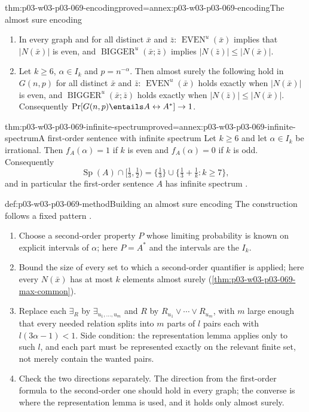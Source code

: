 \begin{hbtheorem}{thm:p03-w03-p03-069-encoding}{proved=annex:p03-w03-p03-069-encoding}{The almost sure encoding}
\begin{enumerate}
\item In every graph and for all distinct \(\bar x\) and \(\bar z\):
\(\operatorname{EVEN}^u(\bar x)\) implies that \(|N(\bar x)|\) is even, and
\(\operatorname{BIGGER}^u(\bar x;\bar z)\) implies
\(|N(\bar z)|\leq|N(\bar x)|\).
\item Let \(k\geq6\), \(\alpha\in I_k\) and \(p=n^{-\alpha}\).  Then almost
surely the following hold in \(G(n,p)\) for all distinct \(\bar x\) and
\(\bar z\): \(\operatorname{EVEN}^u(\bar x)\) holds exactly when
\(|N(\bar x)|\) is even, and \(\operatorname{BIGGER}^u(\bar x;\bar z)\) holds
exactly when \(|N(\bar z)|\leq|N(\bar x)|\).  Consequently
\(\Pr[G(n,p)\entails A\leftrightarrow A^*]\to1\).
\end{enumerate}
\end{hbtheorem}

\begin{hbtheorem}{thm:p03-w03-p03-069-infinite-spectrum}{proved=annex:p03-w03-p03-069-infinite-spectrum}{A first-order sentence with infinite spectrum}
Let \(k\geq6\) and let \(\alpha\in I_k\) be irrational.  Then
\(f_A(\alpha)=1\) if \(k\) is even and \(f_A(\alpha)=0\) if \(k\) is odd.
Consequently
\[
  \operatorname{Sp}(A)\cap\bigl[\tfrac13,\tfrac12\bigr)
  =\{\tfrac13\}\cup\bigl\{\tfrac13+\tfrac1k : k\geq7\bigr\},
\]
and in particular the first-order sentence \(A\) has infinite spectrum
\cite[pp.~16--18]{Spencer2007LogicRandomStructuresAuthor}.
\end{hbtheorem}

\begin{hbmethod}{def:p03-w03-p03-069-method}{Building an almost sure encoding}
The construction follows a fixed pattern
\cite[pp.~16--18]{Spencer2007LogicRandomStructuresAuthor}.
\begin{enumerate}
\item Choose a second-order property \(P\) whose limiting probability is
known on explicit intervals of \(\alpha\); here
\(P=A^*\) and the intervals are the \(I_k\).
\item Bound the size of every set to which a second-order quantifier is
applied; here every \(N(\bar x)\) has at most \(k\) elements almost surely
(\cref{thm:p03-w03-p03-069-max-common}).
\item Replace each \(\exists_R\) by \(\exists_{u_1,\ldots,u_m}\) and \(R\)
by \(R_{u_1}\vee\cdots\vee R_{u_m}\), with \(m\) large enough that every
needed relation splits into \(m\) parts of \(l\) pairs each with
\(l(3\alpha-1)<1\).  Side condition: the representation lemma applies only
to such \(l\), and each part must be represented exactly on the relevant
finite set, not merely contain the wanted pairs.
\item Check the two directions separately.  The direction from the
first-order formula to the second-order one should hold in every graph; the
converse is where the representation lemma is used, and it holds only
almost surely.
\end{enumerate}
\end{hbmethod}

